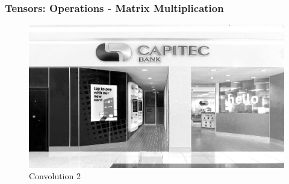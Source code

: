 \documentclass[11pt]{beamer}
\begin{document}
\begin{frame}
	\frametitle{Tensors: Operations - Matrix Multiplication}
	\begin{figure}
		\includegraphics[scale=0.17]{"conv_2"}
		\caption{Convolution 2}
	\end{figure}
\end{frame}
\end{document}

